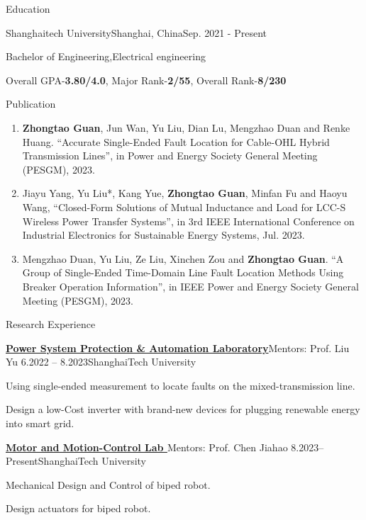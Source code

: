 \documentclass[]{ZhongtaoGuan-resume}
\begin{document}
\resumeheader
{}
{}
{}
{}
{}

\begin{section}{Education}
 \begin{subsectionnobullet}{Shanghaitech University}{Shanghai, China}{Sep. 2021 - Present}{}
     \item{Bachelor of Engineering,Electrical engineering}
     \item{Overall GPA-\textbf{3.80/4.0}, Major Rank-\textbf{2/55}, Overall Rank-\textbf{8/230}}
 \end{subsectionnobullet}
\end{section}

\begin{section}{Publication}
 \begin{enumerate}
     \item \textbf{Zhongtao Guan}, Jun Wan, Yu Liu, Dian Lu, Mengzhao Duan and Renke Huang. “Accurate Single-Ended Fault Location for Cable-OHL Hybrid Transmission Lines”, in Power and Energy Society General Meeting (PESGM), 2023. %
     \item Jiayu Yang, Yu Liu*, Kang Yue, \textbf{Zhongtao Guan}, Minfan Fu and Haoyu Wang, “Closed-Form Solutions of Mutual Inductance and Load for LCC-S Wireless Power Transfer Systems”, in 3rd IEEE International Conference on Industrial Electronics for Sustainable Energy Systems, Jul. 2023.
     \item Mengzhao Duan, Yu Liu, Ze Liu, Xinchen Zou and \textbf{Zhongtao Guan}. “A Group of Single-Ended Time-Domain Line Fault Location Methods Using Breaker Operation Information”, in IEEE Power and Energy Society General Meeting (PESGM), 2023.%
 \end{enumerate}
\end{section}

\begin{section}{Research Experience}
 \begin{subsection}{\textbf{\href{https://pspal.shanghaitech.edu.cn/}{Power System Protection \& Automation Laboratory}}}{Mentors: Prof. Liu Yu}{ 6.2022 -- 8.2023}{ShanghaiTech University}
     \item{Using single-ended measurement to locate faults on the mixed-transmission line.}
     \item{Design a low-Cost inverter with brand-new devices for plugging renewable energy into smart grid.}
 \end{subsection}
 \begin{subsection}{ \textbf{\href{https://faculty.sist.shanghaitech.edu.cn/chenjh/}{Motor and Motion-Control Lab }}}{Mentors: Prof. Chen Jiahao}{ 8.2023--Present}{ShanghaiTech University}
     \item{Mechanical Design and Control of biped robot.}
     \item{Design actuators for biped robot.}
 \end{subsection}
\end{section}
\end{document}
